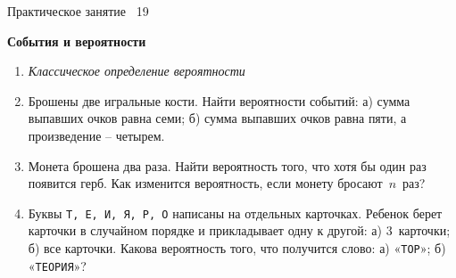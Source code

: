 \documentclass[a4paper,14pt]{extarticle}
\begin{document}
{\centering
 {\small Практическое занятие \textnumero~19 \par}
{\bfseries События и вероятности}
\par}
\begin{enumerate}

\item[]{\centering\itshape Классическое определение вероятности\par}
\item 
Брошены две игральные кости. Найти вероятности событий: а) сумма
выпавших очков равна семи; б) сумма выпавших очков равна пяти, а
произведение – четырем.

\item 
Монета брошена два раза. Найти вероятность того, что хотя бы один раз
появится герб. Как изменится вероятность, если монету бросают~$n$~раз?









\item 
Буквы \texttt{Т, Е, И, Я, Р, О} написаны на отдельных карточках. Ребенок берет
карточки в случайном порядке и прикладывает одну к другой: а) 3~карточки; б) все карточки. Какова вероятность того, что получится
слово: а) «\texttt{ТОР}»; б) «\texttt{ТЕОРИЯ}»?



\end{enumerate}
\end{document}
